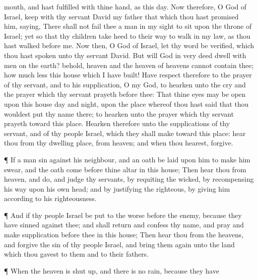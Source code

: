 {mouth, and hast
fulfilled
{} with thine
hand, as
{} this
day.
Now therefore, O
{}
God of
Israel,
keep with thy
servant
David my
father that which thou hast
promised him,
saying, There shall not
fail thee a
man in my
sight to
sit upon the
throne of
Israel; yet
so that thy
children take
heed to their
way to
walk in my
law, as thou hast
walked
before me.
Now then, O
{}
God of
Israel, let thy
word be
verified, which thou hast
spoken unto thy
servant
David.
But will
God in very
deed
dwell with
men on the
earth? behold,
heaven and the
heaven of
heavens cannot
contain thee; how much less this
house which I have
built!
Have
respect therefore to the
prayer of thy
servant, and to his
supplication, O
{} my
God, to
hearken unto the
cry and the
prayer which thy
servant
prayeth
before thee:
That thine
eyes may be
open upon this
house
day and
night, upon the
place whereof thou hast
said that thou wouldest
put thy
name there; to
hearken unto the
prayer which thy
servant
prayeth toward this
place.
Hearken therefore unto the
supplications of thy
servant, and of thy
people
Israel, which they shall
make toward this
place:
hear thou from thy
dwelling
place,
{} from
heaven; and when thou
hearest,
forgive.
\par }{\PP {}¶ If a
man
sin against his
neighbour, and an
oath be
laid upon him to make him
swear, and the
oath
come
before thine
altar in this
house;
Then
hear thou from
heaven, and
do, and
judge thy
servants, by
requiting the
wicked, by
recompensing his
way upon his own
head; and by
justifying the
righteous, by
giving him according to his
righteousness.
\par }{\PP {}¶ And if thy
people
Israel be put to the
worse
before the
enemy, because they have
sinned against thee; and shall
return and
confess thy
name, and
pray and make
supplication
before thee in this
house;
Then
hear thou from the
heavens, and
forgive the
sin of thy
people
Israel, and bring them
again unto the
land which thou
gavest to them and to their
fathers.
\par }{\PP {}¶ When the
heaven is shut
up, and there is no
rain, because they have
}
